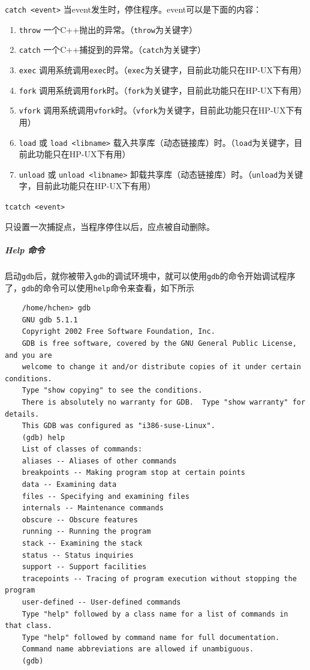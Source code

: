 \documentclass[UTF8,a4paper,12pt]{ctexbook} %
\begin{document}
\begin{itemize}[itemindent = 1em]
						 	\verb|catch <event>| 当event发生时，停住程序。event可以是下面的内容：
						 	
						 	\begin{enumerate}
						 		\item \verb|throw| 一个C++抛出的异常。（\verb|throw|为关键字）
						 		\item \verb|catch| 一个C++捕捉到的异常。（\verb|catch|为关键字）
						 		\item \verb|exec| 调用系统调用\verb|exec|时。（\verb|exec|为关键字，目前此功能只在HP-UX下有用）
						 		\item \verb|fork| 调用系统调用\verb|fork|时。（\verb|fork|为关键字，目前此功能只在HP-UX下有用）
						 		\item \verb|vfork| 调用系统调用\verb|vfork|时。（\verb|vfork|为关键字，目前此功能只在HP-UX下有用）
						 		\item \verb|load| 或 \verb|load <libname>| 载入共享库（动态链接库）时。（\verb|load|为关键字，目前此功能只在HP-UX下有用）
						 		
						 		\item \verb|unload| 或 \verb|unload <libname>| 卸载共享库（动态链接库）时。（\verb|unload|为关键字，目前此功能只在HP-UX下有用）
						 	\end{enumerate}
						 	
						 	\verb|tcatch <event> |
						 	
						 	只设置一次捕捉点，当程序停住以后，应点被自动删除。
					 \end{itemize}
				\subparagraph{Help 命令}启动\verb|gdb|后，就你被带入\verb|gdb|的调试环境中，就可以使用\verb|gdb|的命令开始调试程序了，\verb|gdb|的命令可以使用\verb|help|命令来查看，如下所示
				
				\begin{lstlisting}
	/home/hchen> gdb
	GNU gdb 5.1.1
	Copyright 2002 Free Software Foundation, Inc.
	GDB is free software, covered by the GNU General Public License, and you are
	welcome to change it and/or distribute copies of it under certain conditions.
	Type "show copying" to see the conditions.
	There is absolutely no warranty for GDB.  Type "show warranty" for details.
	This GDB was configured as "i386-suse-Linux".
	(gdb) help
	List of classes of commands:
	aliases -- Aliases of other commands
	breakpoints -- Making program stop at certain points
	data -- Examining data
	files -- Specifying and examining files
	internals -- Maintenance commands
	obscure -- Obscure features
	running -- Running the program
	stack -- Examining the stack
	status -- Status inquiries
	support -- Support facilities
	tracepoints -- Tracing of program execution without stopping the program
	user-defined -- User-defined commands
	Type "help" followed by a class name for a list of commands in that class.
	Type "help" followed by command name for full documentation.
	Command name abbreviations are allowed if unambiguous.
	(gdb)	
				\end{lstlisting}
				
\end{document}
